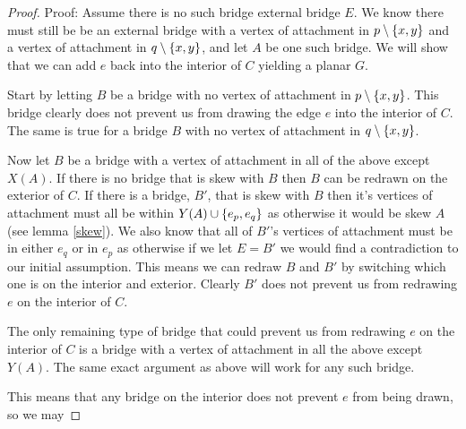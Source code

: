 \documentclass{article}
\begin{document}
\begin{proof}
	Proof: Assume there is no such bridge external bridge $E$. We know there must still be be an external bridge with a vertex of attachment in $p\setminus\left\{ {x,y} \right\}$ and a vertex of attachment in $q\setminus\left\{ {x,y} \right\}$, and let $A$ be one such bridge. We will show that we can add $e$ back into the interior of $C$ yielding a planar $G$.
	
	Start by letting $B$ be a bridge with no vertex of attachment in $p\setminus\left\{ {x,y} \right\}$. This bridge clearly does not prevent us from drawing the edge $e$ into the interior of $C$. The same is true for a bridge $B$ with no vertex of attachment in $q\setminus\left\{ {x,y} \right\}$.
	
	Now let $B$ be a bridge with a vertex of attachment in all of the above except $X(A)$. If there is no bridge that is skew with $B$ then $B$ can be redrawn on the exterior of $C$. If there is a bridge, $B'$, that is skew with $B$ then it's vertices of attachment must all be within $Y(A)\cup\left\{ {e_p,e_q} \right\}$ as otherwise it would be skew $A$ (see lemma \ref{skew}). We also know that all of $B'$'s vertices of attachment must be in either $e_q$ or in $e_p$ as otherwise if we let $E = B'$ we would find a contradiction to our initial assumption. This means we can redraw $B$ and $B'$ by switching which one is on the interior and exterior. Clearly $B'$ does not prevent us from redrawing $e$ on the interior of $C$.
	
	The only remaining type of bridge that could prevent us from redrawing $e$ on the interior of $C$ is a bridge with a vertex of attachment in all the above except $Y(A)$. The same exact argument as above will work for any such bridge.
	
	This means that any bridge on the interior does not prevent $e$ from being drawn, so we may 
\end{proof}
\end{document}
